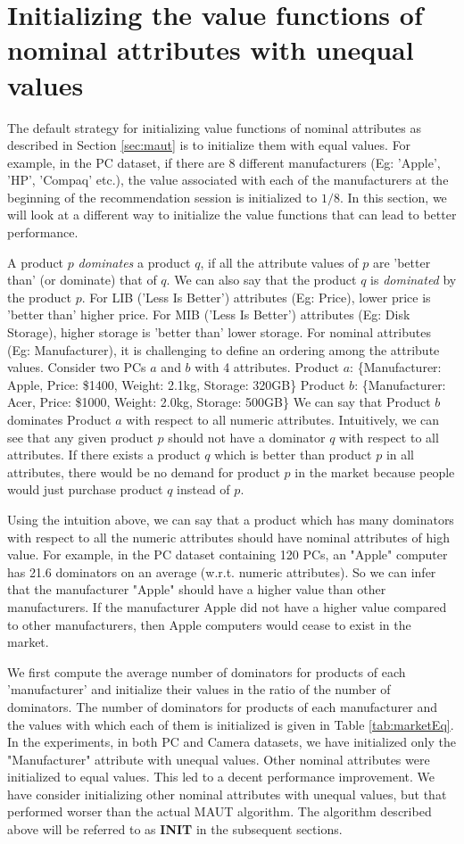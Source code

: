 \section{Initializing the value functions of nominal attributes with unequal values}
\label{sec:marketEq}
The default strategy for initializing value functions of nominal attributes as described in Section \ref{sec:maut} is to initialize them with equal values. 
For example, in the PC dataset, if there are 8 different manufacturers (Eg: 'Apple', 'HP', 'Compaq' etc.), the value associated with each of the manufacturers at the beginning of the recommendation session is initialized to $1/8$.
In this section, we will look at a different way to initialize the value functions that can lead to better performance.

A product $p$ \textit{dominates} a product $q$, if all the attribute values of $p$ are 'better than' (or dominate) that of $q$. 
We can also say that the product $q$ is \textit{dominated} by the product $p$.
For LIB ('Less Is Better') attributes (Eg: Price), lower price is 'better than' higher price.
For MIB ('Less Is Better') attributes (Eg: Disk Storage), higher storage is 'better than' lower storage.
For nominal attributes (Eg: Manufacturer), it is challenging to define an ordering among the attribute values.
Consider two PCs $a$ and $b$ with 4 attributes.
Product $a$: \{Manufacturer: Apple, Price: \$1400, Weight: 2.1kg, Storage: 320GB\}
Product $b$: \{Manufacturer: Acer, Price: \$1000, Weight: 2.0kg, Storage: 500GB\}
We can say that Product $b$ dominates Product $a$ with respect to all numeric attributes.
Intuitively, we can see that any given product $p$ should not have a dominator $q$ with respect to all attributes.
If there exists a product $q$ which is better than product $p$ in all attributes, there would be no demand for product $p$ in the market because people would just purchase product $q$ instead of $p$.

Using the intuition above, we can say that a product which has many dominators with respect to all the numeric attributes should have nominal attributes of high value.
For example, in the PC dataset containing 120 PCs, an "Apple" computer has 21.6 dominators on an average (w.r.t. numeric attributes).
So we can infer that the manufacturer "Apple" should have a higher value than other manufacturers. 
If the manufacturer Apple did not have a higher value compared to other manufacturers, then Apple computers would cease to exist in the market.

We first compute the average number of dominators for products of each 'manufacturer' and initialize their values in the ratio of the number of dominators.
The number of dominators for products of each manufacturer and the values with which each of them is initialized is given in Table \ref{tab:marketEq}.
In the experiments, in both PC and Camera datasets, we have initialized only the "Manufacturer" attribute with unequal values. Other nominal attributes were initialized to equal values. This led to a decent performance improvement.
We have consider initializing other nominal attributes with unequal values, but that performed worser than the actual MAUT algorithm.
The algorithm described above will be referred to as \textbf{INIT} in the subsequent sections.


